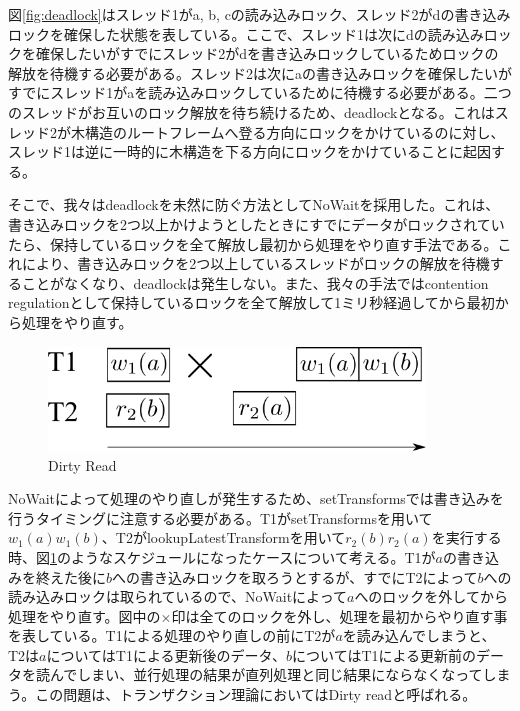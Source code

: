 \documentclass[a4paper]{jreport}	%
\begin{document}
図\ref{fig:deadlock}はスレッド1がa, b, cの読み込みロック、スレッド2がdの書き込みロックを確保した状態を表している。ここで、スレッド1は次にdの読み込みロックを確保したいがすでにスレッド2がdを書き込みロックしているためロックの解放を待機する必要がある。スレッド2は次にaの書き込みロックを確保したいがすでにスレッド1がaを読み込みロックしているために待機する必要がある。二つのスレッドがお互いのロック解放を待ち続けるため、deadlockとなる。これはスレッド2が木構造のルートフレームへ登る方向にロックをかけているのに対し、スレッド1は逆に一時的に木構造を下る方向にロックをかけていることに起因する。


そこで、我々はdeadlockを未然に防ぐ方法としてNoWait\cite{nowait}を採用した。これは、書き込みロックを2つ以上かけようとしたときにすでにデータがロックされていたら、保持しているロックを全て解放し最初から処理をやり直す手法である。これにより、書き込みロックを2つ以上しているスレッドがロックの解放を待機することがなくなり、deadlockは発生しない。また、我々の手法ではcontention regulationとして保持しているロックを全て解放して1ミリ秒経過してから最初から処理をやり直す。

\begin{figure}[h] 
\centering
\includegraphics[width=10cm]{dirty-read}
\caption{Dirty Read}
\label{fig:dirty-read}
\end{figure}


NoWaitによって処理のやり直しが発生するため、setTransformsでは書き込みを行うタイミングに注意する必要がある。T1がsetTransformsを用いて$w_1(a)w_1(b)$、T2がlookupLatestTransformを用いて$r_2(b)r_2(a)$を実行する時、図\ref{fig:dirty-read}のようなスケジュールになったケースについて考える。T1が$a$の書き込みを終えた後に$b$への書き込みロックを取ろうとするが、すでにT2によって$b$への読み込みロックは取られているので、NoWaitによって$a$へのロックを外してから処理をやり直す。図中の$\times$印は全てのロックを外し、処理を最初からやり直す事を表している。T1による処理のやり直しの前にT2が$a$を読み込んでしまうと、T2は$a$についてはT1による更新後のデータ、$b$についてはT1による更新前のデータを読んでしまい、並行処理の結果が直列処理と同じ結果にならなくなってしまう。この問題は、トランザクション理論においてはDirty readと呼ばれる。
\end{document}
